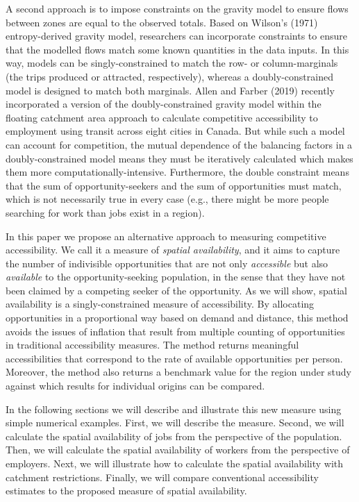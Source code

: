 \documentclass[]{elsarticle} %
\begin{document}
A second approach is to impose constraints on the gravity model to
ensure flows between zones are equal to the observed totals. Based on
Wilson's (1971) entropy-derived gravity model, researchers can
incorporate constraints to ensure that the modelled flows match some
known quantities in the data inputs. In this way, models can be
singly-constrained to match the row- or column-marginals (the trips
produced or attracted, respectively), whereas a doubly-constrained model
is designed to match both marginals. Allen and Farber (2019) recently
incorporated a version of the doubly-constrained gravity model within
the floating catchment area approach to calculate competitive
accessibility to employment using transit across eight cities in Canada.
But while such a model can account for competition, the mutual
dependence of the balancing factors in a doubly-constrained model means
they must be iteratively calculated which makes them more
computationally-intensive. Furthermore, the double constraint means that
the sum of opportunity-seekers and the sum of opportunities must match,
which is not necessarily true in every case (e.g., there might be more
people searching for work than jobs exist in a region).

In this paper we propose an alternative approach to measuring
competitive accessibility. We call it a measure of \emph{spatial
availability}, and it aims to capture the number of indivisible
opportunities that are not only \emph{accessible} but also
\emph{available} to the opportunity-seeking population, in the sense
that they have not been claimed by a competing seeker of the
opportunity. As we will show, spatial availability is a
singly-constrained measure of accessibility. By allocating opportunities
in a proportional way based on demand and distance, this method avoids
the issues of inflation that result from multiple counting of
opportunities in traditional accessibility measures. The method returns
meaningful accessibilities that correspond to the rate of available
opportunities per person. Moreover, the method also returns a benchmark
value for the region under study against which results for individual
origins can be compared.

In the following sections we will describe and illustrate this new
measure using simple numerical examples. First, we will describe the
measure. Second, we will calculate the spatial availability of jobs from
the perspective of the population. Then, we will calculate the spatial
availability of workers from the perspective of employers. Next, we will
illustrate how to calculate the spatial availability with catchment
restrictions. Finally, we will compare conventional accessibility
estimates to the proposed measure of spatial availability.
\end{document}
